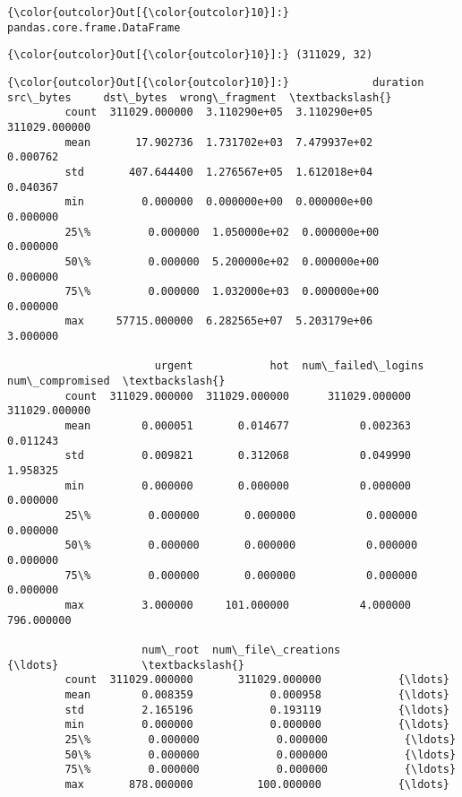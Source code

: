 \documentclass[11pt]{article}
\begin{document}
\begin{Verbatim}[commandchars=\\\{\}]
{\color{outcolor}Out[{\color{outcolor}10}]:} pandas.core.frame.DataFrame
\end{Verbatim}
            
\begin{Verbatim}[commandchars=\\\{\}]
{\color{outcolor}Out[{\color{outcolor}10}]:} (311029, 32)
\end{Verbatim}
            
\begin{Verbatim}[commandchars=\\\{\}]
{\color{outcolor}Out[{\color{outcolor}10}]:}             duration     src\_bytes     dst\_bytes  wrong\_fragment  \textbackslash{}
         count  311029.000000  3.110290e+05  3.110290e+05   311029.000000   
         mean       17.902736  1.731702e+03  7.479937e+02        0.000762   
         std       407.644400  1.276567e+05  1.612018e+04        0.040367   
         min         0.000000  0.000000e+00  0.000000e+00        0.000000   
         25\%         0.000000  1.050000e+02  0.000000e+00        0.000000   
         50\%         0.000000  5.200000e+02  0.000000e+00        0.000000   
         75\%         0.000000  1.032000e+03  0.000000e+00        0.000000   
         max     57715.000000  6.282565e+07  5.203179e+06        3.000000   
         
                       urgent            hot  num\_failed\_logins  num\_compromised  \textbackslash{}
         count  311029.000000  311029.000000      311029.000000    311029.000000   
         mean        0.000051       0.014677           0.002363         0.011243   
         std         0.009821       0.312068           0.049990         1.958325   
         min         0.000000       0.000000           0.000000         0.000000   
         25\%         0.000000       0.000000           0.000000         0.000000   
         50\%         0.000000       0.000000           0.000000         0.000000   
         75\%         0.000000       0.000000           0.000000         0.000000   
         max         3.000000     101.000000           4.000000       796.000000   
         
                     num\_root  num\_file\_creations            {\ldots}             \textbackslash{}
         count  311029.000000       311029.000000            {\ldots}              
         mean        0.008359            0.000958            {\ldots}              
         std         2.165196            0.193119            {\ldots}              
         min         0.000000            0.000000            {\ldots}              
         25\%         0.000000            0.000000            {\ldots}              
         50\%         0.000000            0.000000            {\ldots}              
         75\%         0.000000            0.000000            {\ldots}              
         max       878.000000          100.000000            {\ldots}              
         

\end{Verbatim}
\end{document}
